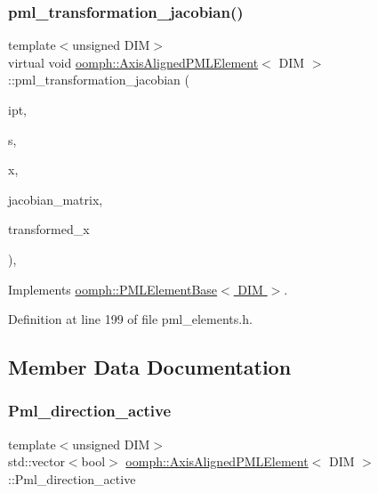\subsubsection{\texorpdfstring{pml\+\_\+transformation\+\_\+jacobian()}{pml\_transformation\_jacobian()}\hspace{0.1cm}{\footnotesize\ttfamily [4/4]}}
{\footnotesize\ttfamily template$<$unsigned D\+IM$>$ \\
virtual void \hyperlink{classoomph_1_1AxisAlignedPMLElement}{oomph\+::\+Axis\+Aligned\+P\+M\+L\+Element}$<$ D\+IM $>$\+::pml\+\_\+transformation\+\_\+jacobian (\begin{DoxyParamCaption}\item[{const unsigned \&}]{ipt,  }\item[{const \hyperlink{classoomph_1_1Vector}{Vector}$<$ double $>$ \&}]{s,  }\item[{const \hyperlink{classoomph_1_1Vector}{Vector}$<$ double $>$ \&}]{x,  }\item[{\hyperlink{classoomph_1_1DenseComplexMatrix}{Dense\+Complex\+Matrix} \&}]{jacobian\+\_\+matrix,  }\item[{\hyperlink{classoomph_1_1Vector}{Vector}$<$ std\+::complex$<$ double $>$ $>$ \&}]{transformed\+\_\+x }\end{DoxyParamCaption})\hspace{0.3cm}{\ttfamily [inline]}, {\ttfamily [virtual]}}



Implements \hyperlink{classoomph_1_1PMLElementBase_a4b9d6d74aa15e6395590b27686477b20}{oomph\+::\+P\+M\+L\+Element\+Base$<$ D\+I\+M $>$}.



Definition at line 199 of file pml\+\_\+elements.\+h.



\subsection{Member Data Documentation}
\mbox{\label{classoomph_1_1AxisAlignedPMLElement_a6cc25fecc2e0f0b8a4920aae2e64964a}} 
\subsubsection{\texorpdfstring{Pml\+\_\+direction\+\_\+active}{Pml\_direction\_active}}
{\footnotesize\ttfamily template$<$unsigned D\+IM$>$ \\
std\+::vector$<$bool$>$ \hyperlink{classoomph_1_1AxisAlignedPMLElement}{oomph\+::\+Axis\+Aligned\+P\+M\+L\+Element}$<$ D\+IM $>$\+::Pml\+\_\+direction\+\_\+active\hspace{0.3cm}{\ttfamily [protected]}}



